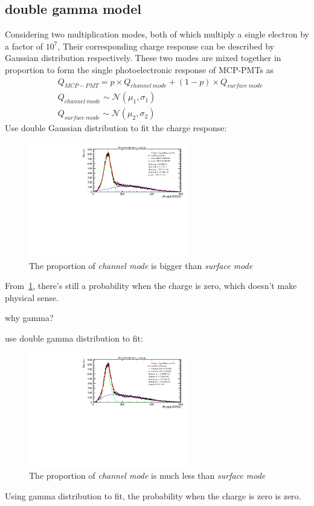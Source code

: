 \documentclass{article}
\begin{document}
\subsection{double gamma model}\label{subsec:doublegamma}
Considering two multiplication modes, both of which multiply a single electron by a factor of $10^7$,
Their corresponding charge response can be described by Gaussian distribution respectively.
These two modes are mixed together in proportion to form the single photoelectronic response of MCP-PMTs as 
\begin{equation}
    \label{eq:doublegaus}
    \begin{aligned}
         & Q_{MCP-PMT} = p\times Q_{channel\  mode} + (1-p)\times Q_{surface\  mode} \\
         & Q_{channel\  mode} \sim \mathcal{N} (\mu_1, \sigma_1)                     \\
         & Q_{surface\  mode} \sim \mathcal{N} (\mu_2, \sigma_2)
    \end{aligned}
\end{equation}
Use double Gaussian distribution to fit the charge response:
\begin{figure}[ht]
    \centering
    \includegraphics[height=5cm]{pic/doubleGauss.pdf}
    \caption{The proportion of \textit{channel mode} is bigger than \textit{surface mode}}\label{fig:doubleGauss}
\end{figure}

From~\ref{fig:doubleGauss}, there's still a probability when the charge is zero, which doesn't make physical sense.

why gamma?

use double gamma distribution to fit:
\begin{figure}[ht]
    \centering
    \includegraphics[height=5cm]{pic/doubleGamma.pdf}
    \caption{The proportion of \textit{channel mode} is much less than \textit{surface mode}}\label{fig:doubleGamma}
\end{figure}
Using gamma distribution to fit, the probability when the charge is zero is zero.
\end{document}
